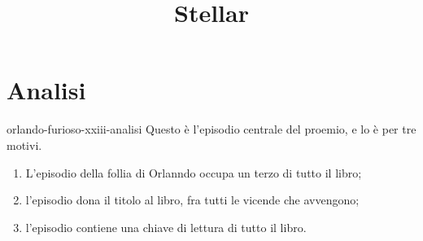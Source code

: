 \documentclass[preview]{standalone}
\begin{document}
\title{Stellar}
\genpage

\section{Analisi}

\begin{snippet}{orlando-furioso-xxiii-analisi}
    Questo è l'episodio centrale del proemio, e lo è per tre motivi.
    \begin{enumerate}
        \item L'episodio della follia di Orlanndo occupa un terzo di tutto il libro;
        \item l'episodio dona il titolo al libro, fra tutti le vicende che avvengono;
        \item l'episodio contiene una chiave di lettura di tutto il libro.
    \end{enumerate}


\end{snippet}
\end{document}
